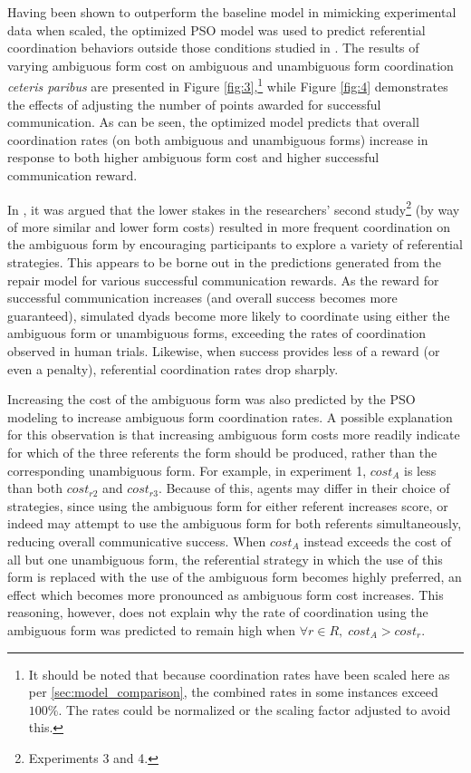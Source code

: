 \documentclass[11pt]{article}
\begin{document}
Having been shown to outperform the baseline model in mimicking experimental data when scaled, the optimized PSO model was used to predict referential coordination behaviors outside those conditions studied in \cite{rohde2012}. The results of varying ambiguous form cost on ambiguous and unambiguous form coordination \textit{ceteris paribus} are presented in Figure \ref{fig:3},\footnote{It should be noted that because coordination rates have been scaled here as per \ref{sec:model_comparison}, the combined rates in some instances exceed $100\%$. The rates could be normalized or the scaling factor adjusted to avoid this.} while Figure \ref{fig:4} demonstrates the effects of adjusting the number of points awarded for successful communication. As can be seen, the optimized model predicts that overall coordination rates (on both ambiguous and unambiguous forms) increase in response to both higher ambiguous form cost and higher successful communication reward.

In \citeauthor{rohde2012}, it was argued that the lower stakes in the researchers' second study\footnote{Experiments 3 and 4.} (by way of more similar and lower form costs) resulted in more frequent coordination on the ambiguous form by encouraging participants to explore a variety of referential strategies. This appears to be borne out in the predictions generated from the repair model for various successful communication rewards. As the reward for successful communication increases (and overall success becomes more guaranteed), simulated dyads become more likely to coordinate using either the ambiguous form or unambiguous forms, exceeding the rates of coordination observed in human trials. Likewise, when success provides less of a reward (or even a penalty), referential coordination rates drop sharply. 

Increasing the cost of the ambiguous form was also predicted by the PSO modeling to increase ambiguous form coordination rates. A possible explanation for this observation is that increasing ambiguous form costs more readily indicate for which of the three referents the form should be produced, rather than the corresponding unambiguous form. For example, in experiment 1, $cost_A$ is less than both $cost_{r2}$ and $cost_{r3}$. Because of this, agents may differ in their choice of strategies, since using the ambiguous form for either referent increases score, or indeed may attempt to use the ambiguous form for both referents simultaneously, reducing overall communicative success. When $cost_A$ instead exceeds the cost of all but one unambiguous form, the referential strategy in which the use of this form is replaced with the use of the ambiguous form becomes highly preferred, an effect which becomes more pronounced as ambiguous form cost increases. This reasoning, however, does not explain why the rate of coordination using the ambiguous form was predicted to remain high when $\forall r \in R,\; cost_A > cost_r$.
\end{document}
